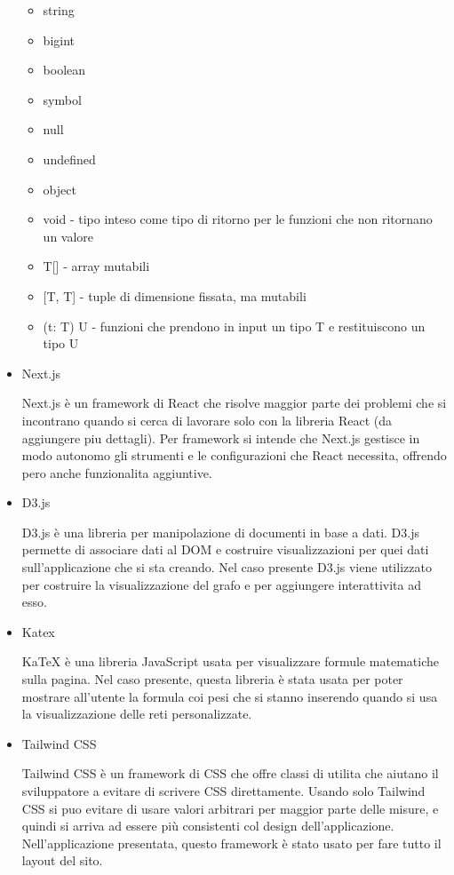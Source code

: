 \documentclass[a4paper,12pt]{report}
\begin{document}
\begin{itemize}
\begin{itemize}
				\item string
				\item bigint
 				\item boolean
				\item symbol
				\item null
				\item undefined
				\item object
				\item void - tipo inteso come tipo di ritorno per le funzioni che non ritornano un valore
				\item T[] - array mutabili
				\item {[T, T]} - tuple di dimensione fissata, ma mutabili
				\item (t: T) U - funzioni che prendono in input un tipo T e restituiscono un tipo U
				\end{itemize}
				\item Next.js \par
				Next.js è un framework di React che risolve maggior parte dei problemi che si incontrano quando si cerca di lavorare solo con la libreria React (da aggiungere piu dettagli). Per framework si intende che Next.js gestisce in modo autonomo gli strumenti e le configurazioni che React necessita, offrendo pero anche funzionalita aggiuntive. \cite{nextjs} \par
				\item D3.js \par
				D3.js è una libreria per manipolazione di documenti in base a dati. D3.js permette di associare dati al DOM e costruire visualizzazioni per quei dati sull’applicazione che si sta creando. Nel caso presente D3.js viene utilizzato per costruire la visualizzazione del grafo e per aggiungere interattivita ad esso. \cite{d3js} \par
				\item Katex \par
				KaTeX è una libreria JavaScript usata per visualizzare formule matematiche sulla pagina. Nel caso presente, questa libreria è stata usata per poter mostrare all’utente la formula coi pesi che si stanno inserendo quando si usa la visualizzazione delle reti personalizzate. \cite{katex} \par
				\item Tailwind CSS \par
				Tailwind CSS è un framework di CSS che offre classi di utilita che aiutano il sviluppatore a evitare di scrivere CSS direttamente. Usando solo Tailwind CSS si puo evitare di usare valori arbitrari per maggior parte delle misure, e quindi si arriva ad essere più consistenti col design dell’applicazione. Nell’applicazione presentata, questo framework è stato usato per fare tutto il layout del sito. \cite{tailwindcss} \par
			\end{itemize}
\end{document}
